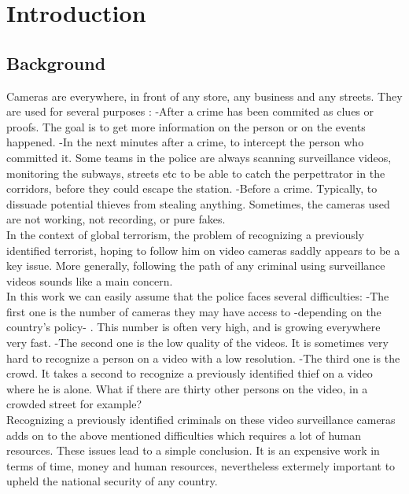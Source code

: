 \setlength{\footskip}{8mm}
\chapter{Introduction}

\section{Background}


Cameras are everywhere, in front of any store, any business and any streets. They are used for several purposes :\newline
-After a crime has been commited as clues or proofs. The goal is to get more information on the person or on the events happened.\newline
-In the next minutes after a crime, to intercept the person who committed it. Some teams in the police are always scanning surveillance videos, monitoring the subways, streets etc to be able to catch the perpettrator in the corridors, before they could escape the station.\newline
-Before a crime. Typically, to dissuade potential thieves from stealing anything. Sometimes, the cameras used are not working, not recording, or pure fakes.\\

In the context of global terrorism, the problem of recognizing a previously identified terrorist, hoping to follow him on video cameras saddly appears to be a key issue. More generally, following the path of any criminal using surveillance videos sounds like a main concern.\\

In this work we can easily assume that the police faces several difficulties:\newline
-The first one is the number of cameras they may have access to -depending on the country's policy- . This number is often very high, and is growing everywhere very fast.\newline
-The second one is the low quality of the videos. It is sometimes very hard to recognize a person on a video with a low resolution.\newline
-The third one is the crowd. It takes a second to recognize a previously identified thief on a video where he is alone. What if there are thirty other persons on the video, in a crowded street for example? \\

Recognizing a previously identified criminals on these video surveillance cameras adds on to the above mentioned difficulties which requires a lot of human resources. These issues lead to a simple conclusion.  It is an expensive work in terms of time, money and human resources, nevertheless extermely important to upheld the national security of any country.\\

